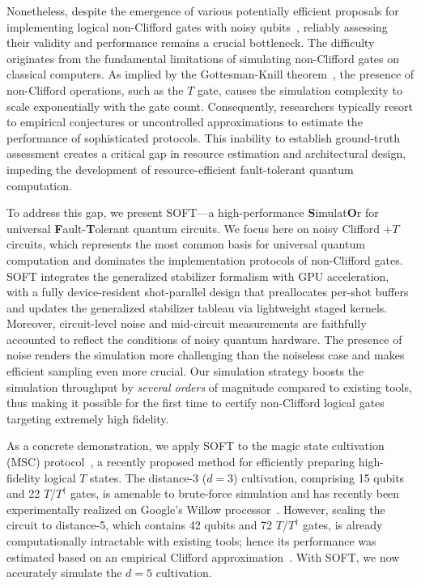 \documentclass[10pt,conference]{IEEEtran}
\begin{document}
Nonetheless, despite the emergence of various potentially efficient proposals for implementing logical non-Clifford gates with noisy qubits~\cite{Litinski19,Chamberland20,gidney2024magic}, reliably assessing their validity and performance remains a crucial bottleneck. 
The difficulty originates from the fundamental limitations of simulating non-Clifford gates on classical computers. As implied by the Gottesman-Knill theorem~\cite{gottesman1997stabilizer}, the presence of non-Clifford operations, such as the $T$ gate, causes the simulation complexity to scale exponentially with the gate count. 
Consequently, researchers typically resort to empirical conjectures or uncontrolled approximations to estimate the performance of sophisticated protocols. This inability to establish ground-truth assessment creates a critical gap in resource estimation and architectural design, impeding the development of resource-efficient fault-tolerant quantum computation.

To address this gap, we present SOFT—a high-performance \textbf{S}imulat\textbf{O}r for universal \textbf{F}ault-\textbf{T}olerant quantum circuits.
We focus here on noisy Clifford $+T$ circuits, which represents the most common basis for universal quantum computation and dominates the implementation protocols of non-Clifford gates. SOFT integrates the generalized stabilizer formalism with GPU acceleration, with a fully device-resident shot-parallel design that preallocates per-shot buffers and updates the generalized stabilizer tableau via lightweight staged kernels.
Moreover, circuit-level noise and mid-circuit measurements are faithfully accounted to reflect the conditions of noisy quantum hardware. 
The presence of noise renders the simulation more challenging than the noiseless case and makes efficient sampling even more crucial.
 Our simulation strategy boosts the simulation throughput by {\it several orders} of magnitude compared to existing tools, thus making it possible for the first time to certify non-Clifford logical gates targeting extremely high fidelity.

As a concrete demonstration, we apply SOFT to the magic state cultivation (MSC) protocol~\cite{gidney2024magic}, a recently proposed method for efficiently preparing high-fidelity logical $T$ states. 
The distance-3 ($d=3$) cultivation, comprising 15 qubits and 22 $T$/$T^\dagger$ gates, is amenable to brute-force simulation and has recently been experimentally realized on Google's Willow processor~\cite{rosenfeld2025magic}. 
However, scaling the circuit to distance-5, which contains 42 qubits and 72 $T$/$T^\dagger$ gates, is already computationally intractable with existing tools; hence its performance was estimated based on an empirical Clifford approximation~\cite{gidney2024magic}.
With SOFT, we now accurately simulate the $d=5$ cultivation.
\end{document}
